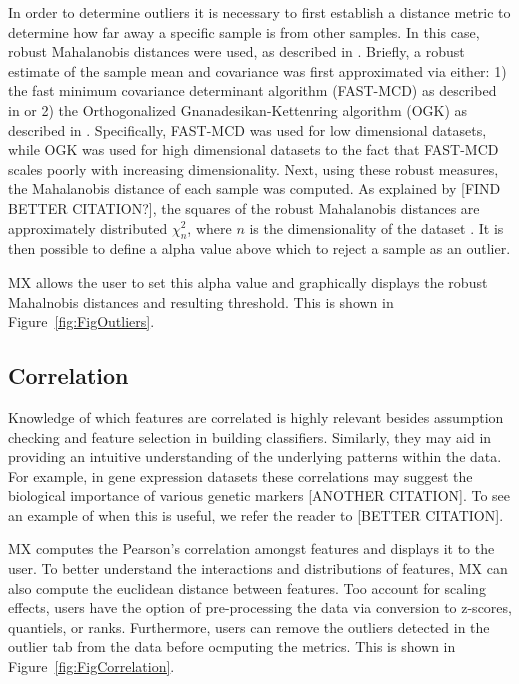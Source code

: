 \documentclass[12pt]{article}
\begin{document}
In order to determine outliers it is necessary to first establish a distance metric to determine how far away a specific sample is from other samples. In this case, robust Mahalanobis distances were used, as described in \cite{hubert2008high}. Briefly, a robust estimate of the sample mean and covariance was first approximated via either: 1) the fast minimum covariance determinant algorithm (FAST-MCD) as described in \cite{rousseeuw1999fast} or 2) the Orthogonalized Gnanadesikan-Kettenring algorithm (OGK) as described in \cite{maronna2002robust}. Specifically, FAST-MCD was used for low dimensional datasets, while OGK was used for high dimensional datasets to the fact that FAST-MCD scales poorly with increasing dimensionality. Next, using these robust measures, the Mahalanobis distance of each sample was computed. As explained by \cite{hardin2012distribution} [FIND BETTER CITATION?], the squares of the robust Mahalanobis distances are approximately distributed $\chi^2_n$, where $n$ is the dimensionality of the dataset . It is then possible to define a alpha value above which to reject a sample as an outlier. 

MX allows the user to set this alpha value and graphically displays the robust Mahalnobis distances and resulting threshold. This is shown in Figure~\ref{fig:FigOutliers}.

\subsection{Correlation}
\label{subsec:SubSecCorrelation}

Knowledge of which features are correlated is highly relevant besides assumption checking and feature selection in building classifiers. Similarly, they may aid in providing an intuitive understanding of the underlying patterns within the data. For example, in gene expression datasets these correlations may suggest the biological importance of various genetic markers [ANOTHER CITATION]. To see an example of when this is useful, we refer the reader to \cite{shi2012unsupervised} [BETTER CITATION].

MX computes the Pearson's correlation amongst features and displays it to the user. To better understand the interactions and distributions of features, MX can also compute the euclidean distance between features. Too account for scaling effects, users have the option of pre-processing the data via conversion to z-scores, quantiels, or ranks. Furthermore, users can remove the outliers detected in the outlier tab from the data before ocmputing the metrics. This is shown in Figure~\ref{fig:FigCorrelation}.
\end{document}
